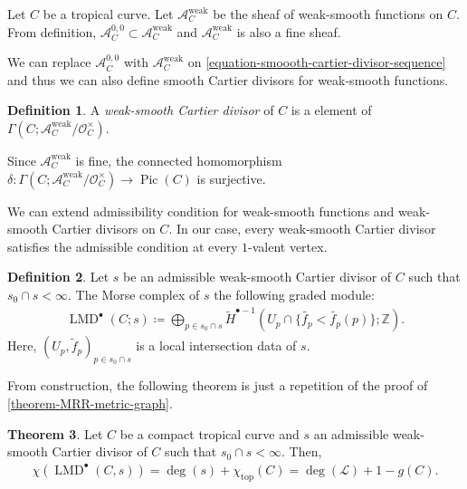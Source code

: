 \documentclass[a4paper,dvipdfmx,reqno,12pt]{amsart}
\theoremstyle{definition}
\newtheorem{theorem}{Theorem}[section]
\newtheorem{definition}[theorem]{Definition}
\newcommand{\deq}{\coloneqq}
\newcommand{\opn}[1]{\operatorname{#1}}
\numberwithin{equation}{section}
\begin{document}
Let $C$ be a tropical curve. 
Let $\mathcal{A}_C^{\opn{weak}}$ be the sheaf 
of weak-smooth functions on $C$. From definition,
$\mathcal{A}_C^{0,0}\subset \mathcal{A}_C^{\opn{weak}}$
and $\mathcal{A}_C^{\opn{weak}}$ is also a fine sheaf.

We can replace $\mathcal{A}_C^{0,0}$ with 
$\mathcal{A}_C^{\opn{weak}}$
on \cref{equation-smoooth-cartier-divisor-sequence}
and thus we can also define smooth Cartier divisors
for weak-smooth functions. 
\begin{definition}
A \emph{weak-smooth Cartier divisor} of $C$ is a 
element of $\Gamma(C;\mathcal{A}_C^{\opn{weak}}/
\mathcal{O}^{\times}_C)$.
\end{definition}

Since $\mathcal{A}_C^{\opn{weak}}$ is fine, 
the connected homomorphism 
$\delta\colon \Gamma(C;\mathcal{A}_C^{\opn{weak}}/
\mathcal{O}^{\times}_C)\to \opn{Pic}(C)$ is 
surjective.


We can extend admissibility condition for
weak-smooth functions and weak-smooth Cartier 
divisors on $C$. In our case, every weak-smooth 
Cartier divisor satisfies the admissible condition 
at every $1$-valent vertex.
\begin{definition}
Let $s$ be an admissible weak-smooth Cartier divisor 
of $C$ such that $s_0\cap s<\infty$.
The Morse complex of $s$ the following graded module:
\begin{align}
  \opn{LMD}^{\bullet}(C;s)\deq \bigoplus_{p\in s_0\cap s} 
\tilde{H}^{\bullet-1}
(U_p\cap \{\tilde{f_p}<\tilde{f_p}(p)\};\mathbb{Z}).
\end{align}
Here, $(U_p,\tilde{f}_p)_{p\in s_0\cap s}$ is a local 
intersection data of $s$.
\end{definition}

From construction, the following theorem is just a
repetition of the proof of 
\cref{theorem-MRR-metric-graph}.

\begin{theorem} \label{theorem-MRR-tropical-curve}
Let $C$ be a compact tropical curve and 
$s$ an admissible weak-smooth Cartier divisor 
of $C$ such that $s_0\cap s<\infty$. Then,
\begin{align}
  \chi(\opn{LMD}^{\bullet}(C,s))=\opn{deg}(s)+
\chi_{\opn{top}}(C)=\opn{deg}(\mathcal{L})+1-g(C).
\end{align}
\end{theorem}
\end{document}

